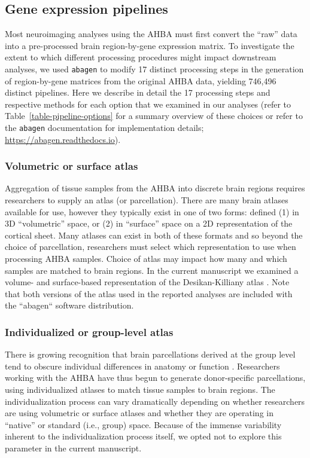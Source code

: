 \documentclass[12pt,aps,pra,reprint,showkeys]{revtex4-1}
\begin{document}
\subsection*{Gene expression pipelines}

Most neuroimaging analyses using the AHBA must first convert the ``raw'' data into a pre-processed brain region-by-gene expression matrix.
To investigate the extent to which different processing procedures might impact downstream analyses, we used \texttt{abagen} to modify 17 distinct processing steps in the generation of region-by-gene matrices from the original AHBA data, yielding 746,496 distinct pipelines.
Here we describe in detail the 17 processing steps and respective methods for each option that we examined in our analyses (refer to Table~\ref{table-pipeline-options} for a summary overview of these choices or refer to the \texttt{abagen} documentation for implementation details; \url{https://abagen.readthedocs.io}).

\subsubsection*{Volumetric or surface atlas}

Aggregation of tissue samples from the AHBA into discrete brain regions requires researchers to supply an atlas (or parcellation).
There are many brain atlases available for use, however they typically exist in one of two forms: defined (1) in 3D ``volumetric'' space, or (2) in ``surface'' space on a 2D representation of the cortical sheet.
Many atlases can exist in both of these formats and so beyond the choice of parcellation, researchers must select which representation to use when processing AHBA samples.
Choice of atlas may impact how many and which samples are matched to brain regions.
In the current manuscript we examined a volume- and surface-based representation of the Desikan-Killiany atlas \citep[see \emph{Methods: Data};][]{desikan2006automated}.
Note that both versions of the atlas used in the reported analyses are included with the ``abagen`` software distribution.

\subsubsection*{Individualized or group-level atlas}

There is growing recognition that brain parcellations derived at the group level tend to obscure individual differences in anatomy or function \citep[e.g.,][]{gordon2017neuron, kong2019cercor, dickie2018biolpsych}.
Researchers working with the AHBA have thus begun to generate donor-specific parcellations, using individualized atlases to match tissue samples to brain regions.
The individualization process can vary dramatically depending on whether researchers are using volumetric or surface atlases and whether they are operating in ``native'' or standard (i.e., group) space.
Because of the immense variability inherent to the individualization process itself, we opted not to explore this parameter in the current manuscript.
\end{document}
